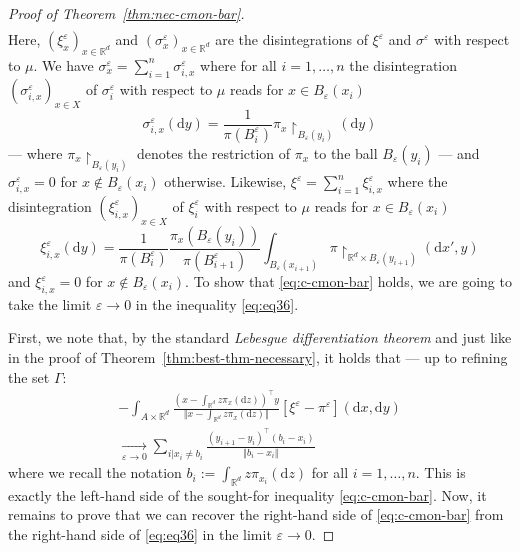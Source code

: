 \documentclass[leqno, 11pt, a4paper]{amsart}
\theoremstyle{definition}
\newcommand{\R}{\mathbb{R}}
\newcommand{\eps}{\varepsilon}
\newcommand{\dd}{\mathrm{d}}
\begin{document}
\begin{proof}[Proof of Theorem~\ref{thm:nec-cmon-bar}]
\begin{multline}
	 \end{multline} 
     Here, $(\xi^\eps_x)_{x \in \R^d}$ and $(\sigma^\eps_x)_{x \in \R^d}$ are the disintegrations of $\xi^\eps$ and $\sigma^\eps$ with respect to $\mu$. We have $\sigma^\eps_{x} = \sum_{i=1}^n \sigma^\eps_{i, x}$ where for all $i = 1, \dots, n$ the disintegration $(\sigma^\eps_{i, x})_{x \in X}$ of $\sigma^\eps_i$ with respect to $\mu$ reads for $x \in B_\eps(x_i)$
	 \begin{equation}
	 	\sigma^\eps_{i, x}(\dd y)= \frac{1}{\pi(B_i^\eps)}\pi_{x}\restriction_{B_\eps(y_i)}(\dd y)
	\end{equation}
	--- where $\pi_{x}\restriction_{B_\eps(y_i)}$ denotes the restriction of $\pi_x$ to the ball $B_\eps(y_i)$ --- and $\sigma^{\eps}_{i, x} = 0$ for $x \notin B_\eps(x_i)$ otherwise. Likewise, $\xi^\eps = \sum_{i=1}^n \xi^\eps_{i, x}$ where the disintegration $(\xi^\eps_{i, x})_{x \in X}$ of $\xi^\eps_i$ with respect to $\mu$ reads for $x \in B_\eps(x_i)$
	\begin{equation}
		\xi^\eps_{i, x}(\dd y) = \frac{1}{\pi(B_i^\eps)} \frac{\pi_x(B_\eps(y_i))}{\pi(B_{i+1}^\eps)} \int_{B_\eps(x_{i+1})} \pi\restriction_{\R^d \times B_\eps(y_{i+1})}(\dd x', y)
	\end{equation}
    and $\xi^\eps_{i, x} = 0$ for $x \notin B_\eps(x_i)$. To show that \eqref{eq:c-cmon-bar} holds, we are going to take the limit $\eps \to 0$ in the inequality \eqref{eq:eq36}.
    
	 First, we note that, by the standard \textit{Lebesgue differentiation theorem} and just like in the proof of Theorem~\ref{thm:best-thm-necessary}, it holds that --- up to refining the set $\Gamma$:
	 \begin{multline}\label{eq:ldt-simple}
    -\int_{A \times \R^d} \frac{(x - \int_{\R^d} z \pi_x(\dd z))^\top y}{\Vert x - \int_{\R^d} z \pi_x(\dd z) \Vert} [\xi^\eps - \pi^\eps](\dd x, \dd y) \\ \xrightarrow[\eps \to 0]{} \sum_{i | x_i \neq b_i} \frac{(y_{i+1} - y_i)^\top (b_i - x_i)}{\Vert b_i - x_i \Vert}
	 \end{multline}
     where we recall the notation $b_i := \int_{\R^d} z \pi_{x_i}(\dd z)$ for all $i = 1, \dots, n$. This is exactly the left-hand side of the sought-for inequality \eqref{eq:c-cmon-bar}. Now, it remains to prove that we can recover the right-hand side of \eqref{eq:c-cmon-bar} from the right-hand side of \eqref{eq:eq36} in the limit $\eps \to 0$.
     

\end{proof}
\end{document}
